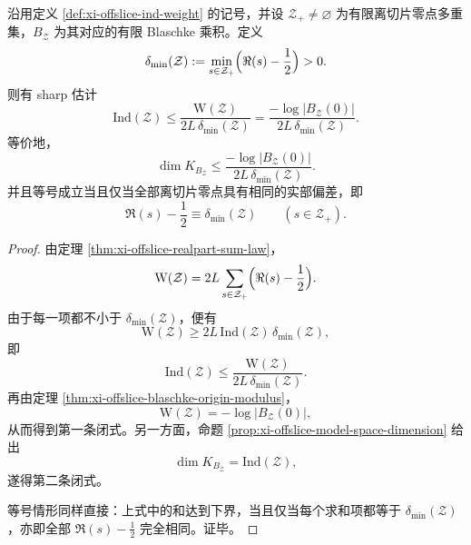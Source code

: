 \begin{theorem}\label{thm:xi-time-part65e-blaschke-origin-modulus-dimension-bound}
沿用定义 \ref{def:xi-offslice-ind-weight} 的记号，并设 \(\mathcal Z_{+}\neq\varnothing\) 为有限离切片零点多重集，\(B_{\mathcal Z}\) 为其对应的有限 Blaschke 乘积。定义
\[
\delta_{\min}(\mathcal Z)
:=
\min_{s\in\mathcal Z_{+}}
\Bigl(\Re(s)-\frac12\Bigr)
>0.
\]
则有 sharp 估计
\[
\mathrm{Ind}(\mathcal Z)
\le
\frac{\mathrm W(\mathcal Z)}{2L\,\delta_{\min}(\mathcal Z)}
=
\frac{-\log|B_{\mathcal Z}(0)|}{2L\,\delta_{\min}(\mathcal Z)}.
\]
等价地，
\[
\dim K_{B_{\mathcal Z}}
\le
\frac{-\log|B_{\mathcal Z}(0)|}{2L\,\delta_{\min}(\mathcal Z)}.
\]
并且等号成立当且仅当全部离切片零点具有相同的实部偏差，即
\[
\Re(s)-\frac12\equiv \delta_{\min}(\mathcal Z)
\qquad(s\in\mathcal Z_{+}).
\]
\end{theorem}
\begin{proof}
由定理 \ref{thm:xi-offslice-realpart-sum-law}，
\[
\mathrm W(\mathcal Z)
=
2L\sum_{s\in\mathcal Z_{+}}
\Bigl(\Re(s)-\frac12\Bigr).
\]
由于每一项都不小于 \(\delta_{\min}(\mathcal Z)\)，便有
\[
\mathrm W(\mathcal Z)\ge 2L\,\mathrm{Ind}(\mathcal Z)\,\delta_{\min}(\mathcal Z),
\]
即
\[
\mathrm{Ind}(\mathcal Z)
\le
\frac{\mathrm W(\mathcal Z)}{2L\,\delta_{\min}(\mathcal Z)}.
\]
再由定理 \ref{thm:xi-offslice-blaschke-origin-modulus}，
\[
\mathrm W(\mathcal Z)=-\log|B_{\mathcal Z}(0)|,
\]
从而得到第一条闭式。另一方面，命题 \ref{prop:xi-offslice-model-space-dimension} 给出
\[
\dim K_{B_{\mathcal Z}}=\mathrm{Ind}(\mathcal Z),
\]
遂得第二条闭式。

等号情形同样直接：上式中的和达到下界，当且仅当每个求和项都等于 \(\delta_{\min}(\mathcal Z)\)，亦即全部 \(\Re(s)-\tfrac12\) 完全相同。证毕。
\end{proof}

